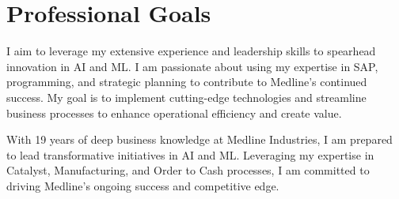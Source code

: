 \documentclass[a4paper,10pt]{article}
\begin{document}
\section*{Professional Goals}
I aim to leverage my extensive experience and leadership skills to spearhead innovation in AI and ML. I am passionate about using my expertise in SAP, programming, and strategic planning to contribute to Medline’s continued success. My goal is to implement cutting-edge technologies and streamline business processes to enhance operational efficiency and create value.

With 19 years of deep business knowledge at Medline Industries, I am prepared to lead transformative initiatives in AI and ML. Leveraging my expertise in Catalyst, Manufacturing, and Order to Cash processes, I am committed to driving Medline’s ongoing success and competitive edge.
\end{document}
